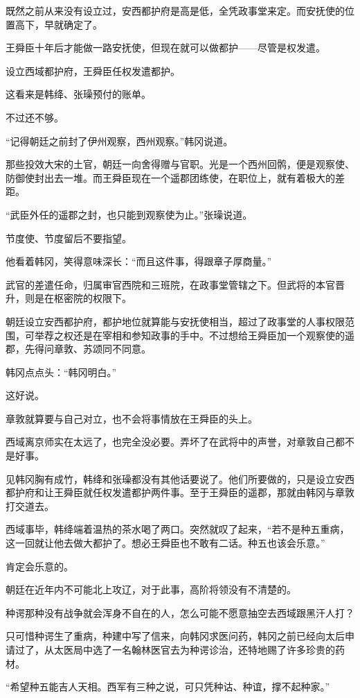 既然之前从来没有设立过，安西都护府是高是低，全凭政事堂来定。而安抚使的位置高下，早就确定了。

王舜臣十年后才能做一路安抚使，但现在就可以做都护——尽管是权发遣。

设立西域都护府，王舜臣任权发遣都护。

这看来是韩绛、张璪预付的账单。

不过还不够。

“记得朝廷之前封了伊州观察，西州观察。”韩冈说道。

那些投效大宋的土官，朝廷一向舍得赠与官职。光是一个西州回鹘，便是观察使、防御使封出去一堆。而王舜臣现在一个遥郡团练使，在职位上，就有着极大的差距。

“武臣外任的遥郡之封，也只能到观察使为止。”张璪说道。

节度使、节度留后不要指望。

他看着韩冈，笑得意味深长：“而且这件事，得跟章子厚商量。”

武官的差遣任命，归属审官西院和三班院，在政事堂管辖之下。但武将的本官晋升，则是在枢密院的权限下。

朝廷设立安西都护府，都护地位就算能与安抚使相当，超过了政事堂的人事权限范围，可举荐之权还是在宰相和参知政事的手中。不过想给王舜臣加一个观察使的遥郡，先得问章敦、苏颂同不同意。

韩冈点点头：“韩冈明白。”

这好说。

章敦就算要与自己对立，也不会将事情放在王舜臣的头上。

西域离京师实在太远了，也完全没必要。弄坏了在武将中的声誉，对章敦自己都不是好事。

见韩冈胸有成竹，韩绛和张璪都没有其他话要说了。他们所要做的，只是设立安西都护府和让王舜臣就任权发遣都护两件事。至于王舜臣的遥郡，那就由韩冈与章敦打交道去。

西域事毕，韩绛端着温热的茶水喝了两口。突然就叹了起来，“若不是种五重病，这一回就让他去做大都护了。想必王舜臣也不敢有二话。种五也该会乐意。”

肯定会乐意的。

朝廷在近年内不可能北上攻辽，对于此事，高阶将领没有不清楚的。

种谔那种没有战争就会浑身不自在的人，怎么可能不愿意抽空去西域跟黑汗人打？

只可惜种谔生了重病，种建中写了信来，向韩冈求医问药，韩冈之前已经向太后申请过了，从太医局中选了一名翰林医官去为种谔诊治，还特地赐了许多珍贵的药材。

“希望种五能吉人天相。西军有三种之说，可只凭种诂、种谊，撑不起种家。”

